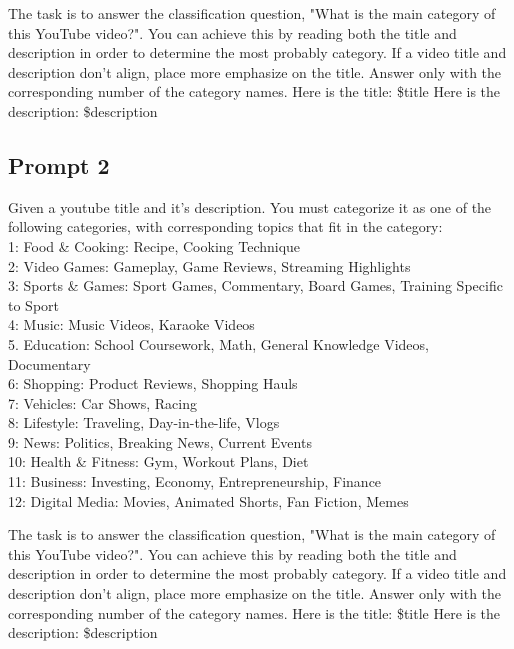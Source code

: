 \documentclass[11pt]{article}
\begin{document}
    The task is to answer the classification question, "What is the main category of this YouTube video?". You can achieve this by reading both the title and description in order to determine the most probably category. If a video title and description don't align, place more emphasize on the title.
    Answer only with the corresponding number of the category names.
    Here is the title: \$title
    Here is the description: \$description
  \subsection{Prompt 2}\label{prompt-two}
  Given a youtube title and it's description. You must categorize it as one of the following categories, with corresponding topics that fit in the category: 
    \\1: Food \& Cooking: Recipe, Cooking Technique
    \\2: Video Games: Gameplay, Game Reviews, Streaming Highlights
    \\3: Sports \& Games: Sport Games, Commentary, Board Games, Training Specific to Sport
    \\4: Music: Music Videos, Karaoke Videos
    \\5. Education: School Coursework, Math, General Knowledge Videos, Documentary
    \\6: Shopping: Product Reviews, Shopping Hauls
    \\7: Vehicles: Car Shows, Racing
    \\8: Lifestyle: Traveling, Day-in-the-life, Vlogs
    \\9: News: Politics, Breaking News, Current Events
    \\10: Health \& Fitness: Gym, Workout Plans, Diet
    \\11: Business: Investing, Economy, Entrepreneurship, Finance
    \\12: Digital Media: Movies, Animated Shorts, Fan Fiction, Memes

    The task is to answer the classification question, "What is the main category of this YouTube video?". You can achieve this by reading both the title and description in order to determine the most probably category. If a video title and description don't align, place more emphasize on the title.
    Answer only with the corresponding number of the category names.
    Here is the title: \$title
    Here is the description: \$description
\end{document}
